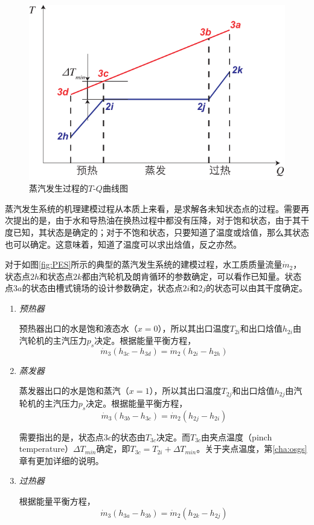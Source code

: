 \noindent \begin{figure}[htbp]
\begin{center}
	\includegraphics[width = 0.5\columnwidth]{fig/PES_TQ}
	\caption{蒸汽发生过程的$T$-$Q$曲线图}
	\label{fig:PES_TQ}
\end{center}
\end{figure}

蒸汽发生系统的机理建模过程从本质上来看，是求解各未知状态点的过程。需要再次提出的是，由于水和导热油在换热过程中都没有压降，对于饱和状态，由于其干度已知，其状态是确定的；对于不饱和状态，只要知道了温度或焓值，那么其状态也可以确定。这意味着，知道了温度可以求出焓值，反之亦然。

对于如图\ref{fig:PES}所示的典型的蒸汽发生系统的建模过程，水工质质量流量$\dot{m}_2$，状态点$2h$和状态点$2k$都由汽轮机及朗肯循环的参数确定，可以看作已知量。状态点$3a$的状态由槽式镜场的设计参数确定，状态点$2i$和$2j$的状态可以由其干度确定。

\begin{enumerate}[label=(\arabic*)]
  \item \emph{预热器}
  
\setlength\parindent{2em}预热器出口的水是饱和液态水（$x = 0$），所以其出口温度$T_{2i}$和出口焓值$h_{2i}$由汽轮机的主汽压力$p_s$决定。根据能量平衡方程，
  \begin{equation}
  \dot{m}_3 (h_{3c}-h_{3d})=\dot{m}_2 (h_{2i} - h_{2h})
  \label{eq:preheater}
\end{equation}

  \item \emph{蒸发器}
  
  蒸发器出口的水是饱和蒸汽（$x = 1$），所以其出口温度$T_{2j}$和出口焓值$h_{2j}$由汽轮机的主汽压力$p_s$决定。根据能量平衡方程，
  \begin{equation}
  \dot{m}_3 (h_{3b}-h_{3c})=\dot{m}_2 (h_{2j} - h_{2i})
  \label{eq:evaporator}
\end{equation}

	需要指出的是，状态点$3c$的状态由$T_{3c}$决定。而$T_{3c}$由夹点温度（pinch temperature）$\Delta T_{min}$确定，即$T_{3c} = T_{2i} + \Delta T_{min}$。关于夹点温度，第\ref{cha:osgs}章有更加详细的说明。
  
  \item \emph{过热器}
  
  根据能量平衡方程，
  \begin{equation}
  \dot{m}_3 (h_{3a}-h_{3b})=\dot{m}_2 (h_{2k} - h_{2j})
  \label{eq:superheater}
\end{equation}

\end{enumerate}

